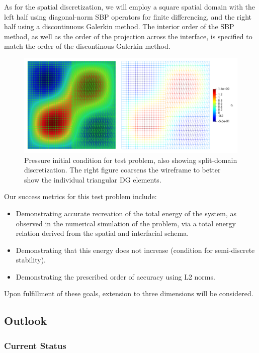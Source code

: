 As for the spatial discretization, we will employ a square spatial domain
with the left half using diagonal-norm SBP operators for finite differencing,
and the right half using a discontinuous Galerkin method. The interior order
of the SBP method, as well as the order of the projection across the interface,
is specified to match the order of the discontinous Galerkin method.
\begin{figure}
\centering
\includegraphics[width=0.8\linewidth,trim=4 4 4 4,clip]{figures/split_domain_wave_double.png}
\caption{Pressure initial condition for test problem, also showing split-domain
	 discretization. The right figure coarsens the wireframe to better show the
	 individual triangular DG elements.}
\label{fig:split_domain}
\end{figure}
Our success metrics for this test problem include:
\begin{itemize}
\item{Demonstrating accurate recreation of the total energy of the system, as observed in the
      numerical simulation of the problem, via a total energy relation derived from the
      spatial and interfacial schema.}
\item{Demonstrating that this energy does not increase (condition for semi-discrete stability).}
\item{Demonstrating the prescribed order of accuracy using L2 norms.}
\end{itemize}
Upon fulfillment of these goals, extension to three dimensions will be considered.

\subsection{Outlook}

\subsubsection{Current Status}

